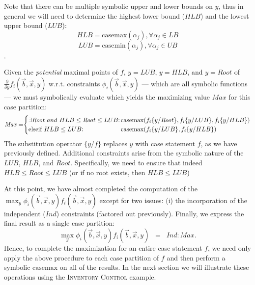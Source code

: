 \documentclass[twoside,11pt]{article}
\newcommand{\casemax}{\mathrm{casemax}}
\newcommand{\casemin}{\mathrm{casemin}}
\newcommand{\UB}{\mathit{UB}}
\newcommand{\LB}{\mathit{LB}}
\newcommand{\IND}{\mathit{Ind}}
\newcommand{\CONS}{\mathit{Cons}}
\newcommand{\Root}{\mathit{Root}}
\newcommand{\Max}{\mathit{Max}}
\newcommand{\sq}{\hspace{-1mm}}
\newcommand{\sqm}{\hspace{-2mm}}
\newcommand{\InventoryControl}{\textsc{Inventory Control }}
\begin{document}
Note that there can be multiple symbolic upper and lower
bounds on $y$, thus in general we will need to determine the highest lower bound ($HLB$) and the lowest upper bound ($LUB$): 
$$HLB = \casemax(\alpha_j), \forall \alpha_j \in \LB$$  $$LUB = \casemin(\alpha_j), \forall \alpha_j \in \UB$$.

Given the \emph{potential} maximal points of $f$, $y = LUB$, $y = HLB$, and
$y = \Root$ of $\frac{\partial}{\partial y} f_i(\vec{b},\vec{x},y)$
w.r.t. constraints $\phi_i(\vec{b},\vec{x},y)$ --- which are all
symbolic functions --- we must symbolically evaluate which yields the
maximizing value $\Max$ for this case partition:
\vspace{2mm}
{%
\begin{align}
\Max =  \sq \begin{cases}
\mbox{$\exists \Root\ and\ HLB \leq \Root \leq LUB$}  \sq: \sq & \sqm \casemax( f_i \{ y / \Root \}, f_i \{ y / LUB \}, f_i \{ y / HLB \})\\
\mbox{elseif}\ HLB \leq LUB \sq:  \sq & \sqm \casemax( f_i \{ y / LUB \}, f_i \{ y / HLB \})
\end{cases}
\label{eq:maxhlblub}
\end{align}}
The 
substitution operator $\{ y / f \}$ replaces $y$ with case statement $f$, as we have previously defined. Additional constraints arise from the
symbolic nature of the $LUB$, $HLB$, and $\Root$. Specifically, we need to ensure that indeed $HLB \leq \Root \leq LUB$
(or if no root exists, then $HLB \leq LUB$)

At this point, we have almost completed the computation
of the $\max_y \phi_i(\vec{b},\vec{x},y) f_i(\vec{b},\vec{x},y)$
except for two issues: (i) the incorporation of the independent ($\IND$) constraints
(factored out previously). 
Finally, we express the final result as a single case partition:
\begin{equation}
\max_y \phi_i(\vec{b},\vec{x},y) f_i(\vec{b},\vec{x},y) \;\; = \;\;
  \IND: \Max .
\label{eq:maxcasepartition}
\end{equation}
Hence, to complete the maximization for an entire case statement $f$, we need only apply the above procedure to each case partition of $f$ and then perform a symbolic $\casemax$ on all of the results. In the next section we will illustrate these operations using the \InventoryControl example.  
\end{document}
